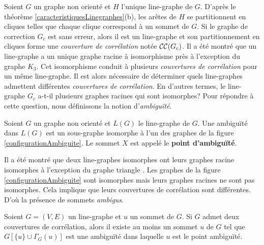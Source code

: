 Soient $G$ un graphe non orient\'e et $H$ l'unique  line-graphe de $G$.
D'apr\`es le th\'eor\`eme \ref{caracteristiquesLinegraphes}(b), les ar\^etes de $H$ se partitionnent en cliques telles que chaque clique correspond \`a un sommet de $G$. 
\newline
Si le graphe de correction $G_c$ est sans erreur, alors il est un line-graphe et son partitionnement en cliques forme une {\em couverture de corr\'elation} not\'ee ${\cal CC}(G_c)$. 
Il a \'et\'e montr\'e que un line-graphe a un unique graphe racine \`a isomorphisme pr\`es \cite{whitney1932congruent} \`a l'exception du graphe $K_3$.
Cet isomorphisme conduit \`a plusieurs {\em couvertures de corr\'elation} pour un m\^eme line-graphe. 
Il est alors n\'ecessaire de d\'eterminer quels line-graphes admettent diff\'erentes {\em couvertures de corr\'elation}. En d'autres termes, le line-graphe $G_c$ a-t-il plusieurs graphes racines qui sont isomorphes?
Pour r\'epondre \`a cette question, nous d\'efinissons la notion d'{\em ambigu\"{i}t\'e}. 
\newline

\begin{definition}
Soient $G$ un graphe non orient\'e et $L(G)$ le line-graphe de $G$. 
\newline
Une ambigu\"{i}t\'e dans $L(G)$ est un sous-graphe isomorphe \`a l'un des graphes de la figure \ref{configurationAmbiguite}. Le sommet $X$ est appel\'e le {\bf point d'ambigu\"{i}t\'e}.
\end{definition}

Il a \'et\'e montr\'e que deux line-graphes isomorphes ont leurs graphes racine isomorphes \`a l'exception du graphe triangle \cite{whitney1932congruent}. Les graphes de la figure \ref{configurationAmbiguite} sont isomorphes mais leurs graphes racines ne sont pas isomorphes. Cela implique que leurs couvertures de corr\'elation sont diff\'erentes. D'o\`u la pr\'esence de sommets {\em ambigus}.

\begin{lemma}
	Soient $G = (V,E)$ un line-graphe  et $u$ un sommet de $G$. 
	\newline
	Si $G$ admet deux couvertures de corr\'elation, alors il existe au moins un sommet $u$ de $G$ tel que $G[\{u\} \cup \Gamma_{G}(u)]$ est une ambigu\"{i}t\'e dans laquelle $u$ est le point ambigu\"{i}t\'e.
\end{lemma}
	
